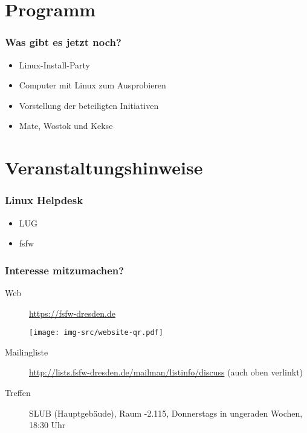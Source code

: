\documentclass[t]{beamer}
\begin{document}
\section{Programm}
\begin{frame}
  \frametitle{Was gibt es jetzt noch?}
  \begin{itemize}
  \item Linux-Install-Party
  \item Computer mit Linux zum Ausprobieren
  \item Vorstellung der beteiligten Initiativen
  \item Mate, Wostok und Kekse
  \end{itemize}
\end{frame}

\section{Veranstaltungshinweise}
\begin{frame}
  \frametitle{Linux Helpdesk}
  \begin{itemize}
  \item LUG
  \item fsfw
  \end{itemize}
\end{frame}

\begin{frame}
  \frametitle{Interesse mitzumachen?}
  \begin{description}
  \item[Web] \url{https://fsfw-dresden.de}\\
    \begin{center}
      \hspace*{-6em}
      \texttt{[image: img-src/website-qr.pdf]}
    \end{center}
  \item[Mailingliste] \url{http://lists.fsfw-dresden.de/mailman/listinfo/discuss} (auch oben verlinkt)
  \item[Treffen] SLUB (Hauptgebäude), Raum -2.115, Donnerstags in ungeraden Wochen, 18:30 Uhr
  \end{description}
\end{frame}
\end{document}
